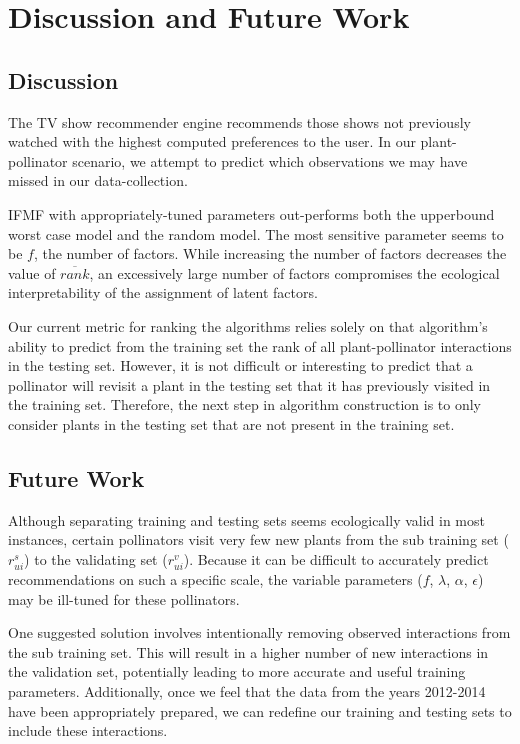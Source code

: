 \documentclass[twocolumn]{article}
\begin{document}
\section{Discussion and Future Work}

\subsection{Discussion}
The TV show recommender engine recommends those shows not previously 
watched with the highest computed preferences to the user. In our 
plant-pollinator scenario, we attempt to predict which observations 
we may have missed in our data-collection.

IFMF with appropriately-tuned parameters out-performs both the upperbound worst case model and the random model. 
The most sensitive parameter seems to be $f$, the number of factors. While increasing the number of
factors decreases the value of $\overline{rank}$, an excessively large number of factors compromises the 
ecological interpretability of the assignment of latent factors. 

Our current metric for ranking the algorithms relies solely on that algorithm's ability to predict
from the training set the rank of all plant-pollinator interactions in the testing set. However, it is 
not difficult or 
interesting to predict that a pollinator will revisit a plant in the testing set that it has previously 
visited in the training set. Therefore, the next step in algorithm construction is to only consider plants in the
testing set that are not present in the training set.

\subsection{Future Work}

Although separating training and testing sets seems ecologically valid
in most instances, certain pollinators visit very few new plants from
the sub training set ($r^s_{ui}$) to the validating set ($r^v_{ui}$). 
Because it can be difficult to accurately predict recommendations on 
such a specific scale, the variable parameters ($f$, $\lambda$, $\alpha$, 
$\epsilon$) may be ill-tuned for these pollinators. 

One suggested solution involves intentionally removing observed
interactions from the sub training set. This will result in a higher number
of new interactions in the validation set, potentially leading to more
accurate and useful training parameters. Additionally, once we feel that
the data from the years 2012-2014 have been appropriately prepared, we 
can redefine our training and testing sets to include these interactions.
\end{document}
